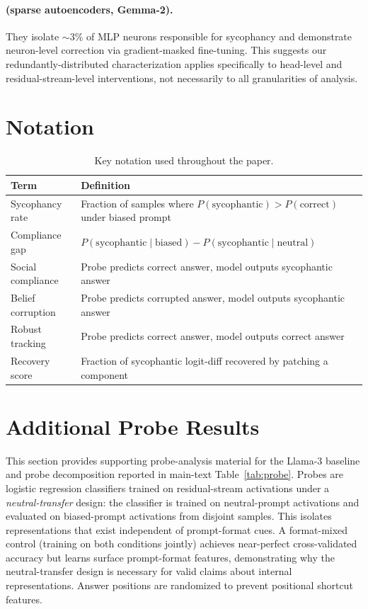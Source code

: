 \documentclass{article}
\begin{document}
\paragraph{\citet{obrien2026fewbad} (sparse autoencoders, Gemma-2).} They isolate ${\sim}3\%$ of MLP neurons responsible for sycophancy and demonstrate neuron-level correction via gradient-masked fine-tuning. This suggests our redundantly-distributed characterization applies specifically to head-level and residual-stream-level interventions, not necessarily to all granularities of analysis.

\FloatBarrier
\section{Notation}
\label{app:notation}

\begin{table}[H]
\centering
\caption{Key notation used throughout the paper.}
\label{tab:notation}
\small
\begin{tabular}{@{}ll@{}}
\toprule
\textbf{Term} & \textbf{Definition} \\
\midrule
Sycophancy rate & Fraction of samples where $P(\text{sycophantic}) > P(\text{correct})$ under biased prompt \\
Compliance gap & $P(\text{sycophantic} \mid \text{biased}) - P(\text{sycophantic} \mid \text{neutral})$ \\
Social compliance & Probe predicts correct answer, model outputs sycophantic answer \\
Belief corruption & Probe predicts corrupted answer, model outputs sycophantic answer \\
Robust tracking & Probe predicts correct answer, model outputs correct answer \\
Recovery score & Fraction of sycophantic logit-diff recovered by patching a component \\
\bottomrule
\end{tabular}
\end{table}

\FloatBarrier
\section{Additional Probe Results}
\label{app:probe_layers}

This section provides supporting probe-analysis material for the Llama-3 baseline and probe decomposition reported in main-text Table~\ref{tab:probe}. Probes are logistic regression classifiers trained on residual-stream activations under a \emph{neutral-transfer} design: the classifier is trained on neutral-prompt activations and evaluated on biased-prompt activations from disjoint samples. This isolates representations that exist independent of prompt-format cues. A format-mixed control (training on both conditions jointly) achieves near-perfect cross-validated accuracy but learns surface prompt-format features, demonstrating why the neutral-transfer design is necessary for valid claims about internal representations. Answer positions are randomized to prevent positional shortcut features.
\end{document}
